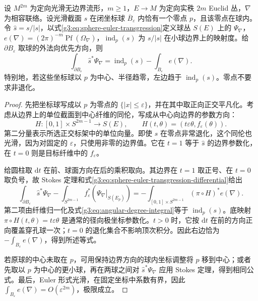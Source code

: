 \begin{proposition}\label{g3:prop:angular-local-index-integral}
	设 \(M^{2m}\) 为定向光滑无边界流形，\(m\ge1\)，\(E\to M\) 为定向实秩 \(2m\) Euclid 丛，\(\nabla\) 为相容联络。设光滑截面 \(s\) 在闭坐标球 \(\overline B_\varepsilon\) 内恰有一个零点 \(p\)，且该零点在球内。令 \(\widehat s=s/|s|\)，以式\eqref{g3:eq:sphere-euler-transgression}定义球丛 \(S(E)\) 上的 \(\Psi_\nabla\)，\(e(\nabla)=(2\pi)^{-m}\operatorname{Pf}(\Omega_\nabla)\)，\(\operatorname{ind}_p(s)\) 为 \(s/|s|\) 在小球边界上的映射度。给 \(\partial B_\varepsilon\) 取球的外法向优先方向，则
	\begin{equation}\label{g3:eq:angular-local-index-integral}
		\int_{\partial B_\varepsilon}\widehat s^*\Psi_\nabla
		=\operatorname{ind}_p(s)-\int_{B_\varepsilon}e(\nabla).
	\end{equation}
	特别地，若这些坐标球以 \(p\) 为中心、半径趋零，左边趋于 \(\operatorname{ind}_p(s)\)。零点不要求非退化。
\end{proposition}
\begin{proof}
	先把坐标球写成以 \(p\) 为零点的 \(\{|x|\le\varepsilon\}\)，并在其中取正向正交平凡化。考虑从边界上的单位截面到中心纤维的同伦，写成从中心向边界的参数方向：
	\[
		H:[0,1]\times S^{2m-1}\longrightarrow S(E),\qquad
		H(t,\theta)=(t\varepsilon\theta,f_\varepsilon(\theta)).
	\]
	第二分量表示所选正交标架中的单位向量。即使 \(s\) 在零点非常退化，这个同伦也光滑，因为对固定的 \(\varepsilon\)，只使用非零的边界值。它在 \(t=1\) 等于 \(\widehat s\) 的边界参数化，在 \(t=0\) 则是目标纤维中的 \(f_\varepsilon\)。

	给圆柱取 \(\mathrm dt\) 在前、球面方向在后的乘积取向。其边界在 \(t=1\) 取正号、在 \(t=0\) 取负号，故 Stokes 定理和式\eqref{g3:eq:sphere-euler-transgression-differential}给出
	\[
		\int_{\partial B_\varepsilon}\widehat s^*\Psi_\nabla
		-\int_{S^{2m-1}}f_\varepsilon^*
		\left(\left.\Psi_\nabla\right|_{S(E_p)}\right)
		=-\int_{[0,1]\times S^{2m-1}}(\pi\circ H)^*e(\nabla).
	\]
	第二项由纤维归一化及式\eqref{g3:eq:angular-degree-integral}等于 \(\operatorname{ind}_p(s)\)。底映射 \(\pi\circ H(t,\theta)=t\varepsilon\theta\) 是通常的径向极坐标参数化。\(t>0\) 时，它按 \(\mathrm dt\) 在前的方向正向覆盖穿孔球一次；\(t=0\) 的退化集合不影响顶次积分。因此右边恰为 \(-\int_{B_\varepsilon}e(\nabla)\)，得到所述等式。

	若原球的中心未取在 \(p\)，可用保持边界方向的球内坐标调整将 \(p\) 移到中心；或者先取以 \(p\) 为中心的更小球，再在两球之间对 \(\widehat s^*\Psi_\nabla\) 应用 Stokes 定理，得到相同公式。最后，Euler 形式光滑，在固定坐标中系数有界，因此 \(\int_{B_\varepsilon}e(\nabla)=O(\varepsilon^{2m})\)，极限成立。
\end{proof}

